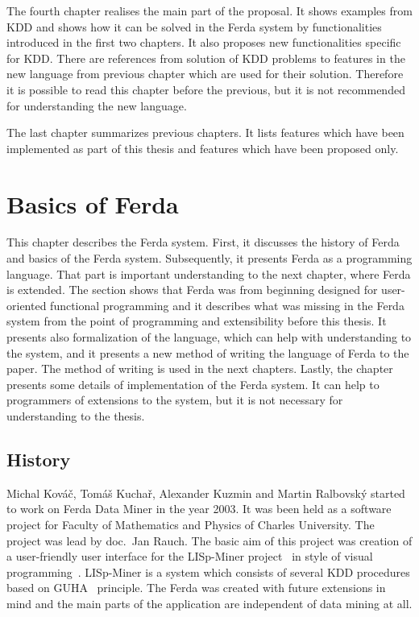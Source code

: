 \documentclass[a4paper,12pt]{book}
\begin{document}
The fourth chapter realises the main part of the proposal. It shows examples from KDD and shows how it can be solved in the Ferda system by functionalities introduced in the first two chapters. It also proposes new functionalities specific for KDD. There are references from solution of KDD problems to features in the new language from previous chapter which are used for their solution. Therefore it is possible to read this chapter before the previous, but it is not recommended for understanding the new language.

The last chapter summarizes previous chapters. It lists features which have been implemented as part of this thesis and features which have been proposed only.

\chapter{Basics of Ferda}
This chapter describes the Ferda system. First, it discusses the history of Ferda and basics of the Ferda system. Subsequently, it presents Ferda as a programming language. That part is important understanding to the next chapter, where Ferda is extended. The section shows that Ferda was from beginning designed for user-oriented functional programming and it describes what was missing in the Ferda system from the point of programming and extensibility before this thesis. It presents also formalization of the language, which can help with understanding to the system, and it presents a new method of writing the language of Ferda to the paper. The method of writing is used in the next chapters. Lastly, the chapter presents some details of implementation of the Ferda system. It can help to programmers of extensions to the system, but it is not necessary for understanding to the thesis. 

\section{History}
Michal Kováč, Tomáš Kuchař, Alexander Kuzmin and Martin Ralbovský started to work on Ferda Data Miner in the year 2003. It was been held as a software project for Faculty of Mathematics and Physics of Charles University. The project was lead by doc.~Jan Rauch. The basic aim of this project was creation of a user-friendly user interface for the LISp-Miner project~\cite{LISp-Miner} in style of visual programming~\cite{WikiVisualProgrammingLaguage}. LISp-Miner is a system which consists of several KDD procedures based on GUHA~\cite{GUHAbook} principle. The Ferda was created with future extensions in mind and the main parts of the application are independent of data mining at all.
\end{document}
